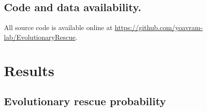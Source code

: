 \documentclass[12pt]{extarticle}
\begin{document}

\subsection*{Code and data availability.} All source code is available online at \url{https://github.com/yoavram-lab/EvolutionaryRescue}.


\section*{Results}


\subsection*{Evolutionary rescue probability}
\end{document}
